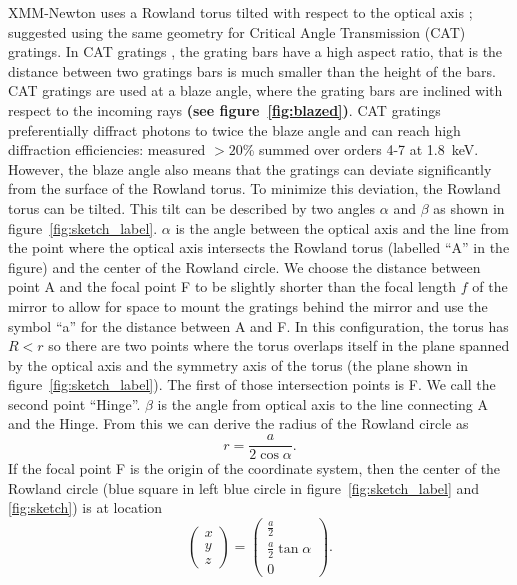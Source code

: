 \documentclass[linenumbers]{aastex631}
\begin{document}
XMM-Newton uses a Rowland torus tilted with respect to the optical axis \citep{2010SSRv..157...15P}; \citet{2010SPIE.7732E..1JH} suggested using the same geometry for Critical Angle Transmission (CAT) gratings. In CAT gratings \citep{2021hai4.book..235H,2022ApJ...934..171H}, the grating bars have a high aspect ratio, that is the distance between two gratings bars is much smaller than the height of the bars. CAT gratings are used at a blaze angle, where the grating bars are inclined with respect to the incoming rays \textbf{(see figure~\ref{fig:blazed})}. CAT gratings preferentially diffract photons to twice the blaze angle and can reach high diffraction efficiencies: \citet{2022ApJ...934..171H} measured $>20$\% summed over orders 4-7 at 1.8~keV. However, the blaze angle also means that the gratings can deviate significantly from the surface of the  Rowland torus. To minimize this deviation, the Rowland torus can be tilted.
This tilt can be described by two angles $\alpha$ and $\beta$ as shown in figure~\ref{fig:sketch_label}. $\alpha$ is the angle between the optical axis and the line from the point where the optical axis intersects the Rowland torus (labelled ``A'' in the figure) and the center of the Rowland circle.  We choose the distance between point A and the focal point F to be slightly shorter than the focal length $f$ of the mirror to allow for space to mount the gratings behind the mirror and use the symbol ``a'' for the distance between A and F.
In this configuration, the torus has $R < r$ so there are two points where the torus overlaps itself in the plane spanned by the optical axis and the symmetry axis of the torus (the plane shown in figure~\ref{fig:sketch_label}). The first of those intersection points is F. We call the second point ``Hinge''.
$\beta$ is the angle from optical axis to the line connecting A and the Hinge. From this we can derive the radius of the Rowland circle as
$$r = \frac{a}{2\cos \alpha}.$$
 If the focal point F is the origin of the coordinate system, then the center of the Rowland circle (blue square in left blue circle in figure~\ref{fig:sketch_label} and \ref{fig:sketch}) is at location
 \begin{equation}
    \begin{pmatrix} x \\ y \\ z \end{pmatrix} =
    \begin{pmatrix} \frac{a}{2} \\ \frac{a}{2}  \tan\alpha \\ 0\end{pmatrix}.
 \end{equation}
\end{document}
